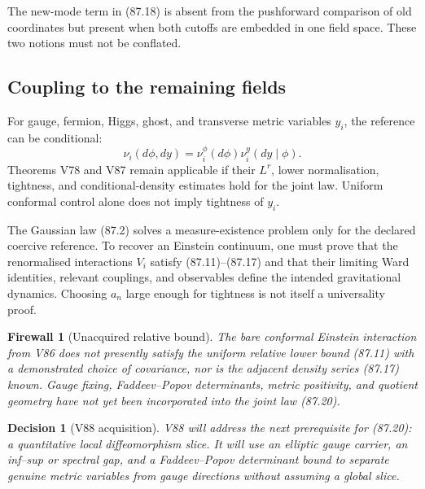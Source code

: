 \documentclass[11pt]{article}
\newtheorem{firewall}[theorem]{Firewall}
\newtheorem{decision}[theorem]{Decision}
\begin{document}
The new-mode term in (87.18) is absent from the pushforward comparison
of old coordinates but present when both cutoffs are embedded in one
field space.  These two notions must not be conflated.

\subsection{Coupling to the remaining fields}

For gauge, fermion, Higgs, ghost, and transverse metric variables
\(y_i\), the reference can be conditional:
\[
                         \nu_i(d\phi,dy)
                         =\nu_i^\phi(d\phi)\nu_i^y(dy\mid\phi).
                                                                    \tag{87.20}
\]
Theorems V78 and V87 remain applicable if their \(L^r\), lower
normalisation, tightness, and conditional-density estimates hold for
the joint law.  Uniform conformal control alone does not imply
tightness of \(y_i\).

\begin{warning}
\label{warn:v11v87-equivalence}
The Gaussian law (87.2) solves a measure-existence problem only for
the declared coercive reference.  To recover an Einstein continuum,
one must prove that the renormalised interactions \(V_i\) satisfy
(87.11)--(87.17) and that their limiting Ward identities, relevant
couplings, and observables define the intended gravitational
dynamics.  Choosing \(a_n\) large enough for tightness is not itself
a universality proof.
\end{warning}

\begin{firewall}[Unacquired relative bound]
\label{fire:v11v87-boundary}
The bare conformal Einstein interaction from V86 does not presently
satisfy the uniform relative lower bound (87.11) with a demonstrated
choice of covariance, nor is the adjacent density series (87.17)
known.  Gauge fixing, Faddeev--Popov determinants, metric positivity,
and quotient geometry have not yet been incorporated into the joint
law (87.20).
\end{firewall}

\begin{decision}[V88 acquisition]
\label{dec:v11v87-next}
V88 will address the next prerequisite for (87.20): a quantitative
local diffeomorphism slice.  It will use an elliptic gauge carrier,
an inf--sup or spectral gap, and a Faddeev--Popov determinant bound to
separate genuine metric variables from gauge directions without
assuming a global slice.
\end{decision}
\end{document}
